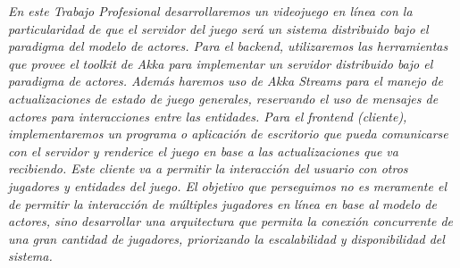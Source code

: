 \textit{
    En este Trabajo Profesional desarrollaremos un videojuego en línea con la particularidad de que el servidor del juego será un sistema distribuido bajo el paradigma del modelo de actores.
Para el backend, utilizaremos las herramientas que provee el toolkit de Akka para implementar un servidor distribuido bajo el paradigma de actores. Además haremos uso de Akka Streams para el manejo de actualizaciones de estado de juego generales, reservando el uso de mensajes de actores para interacciones entre las entidades.
Para el frontend (cliente), implementaremos un programa o aplicación de escritorio que pueda comunicarse con el servidor y renderice el juego en base a las actualizaciones que va recibiendo. Este cliente va a permitir la interacción del usuario con otros jugadores y entidades del juego.
El objetivo que perseguimos no es meramente el de permitir la interacción de múltiples jugadores en línea en base al modelo de actores, sino desarrollar una arquitectura que permita la conexión concurrente de una gran cantidad de jugadores, priorizando la escalabilidad y disponibilidad del sistema.
}
